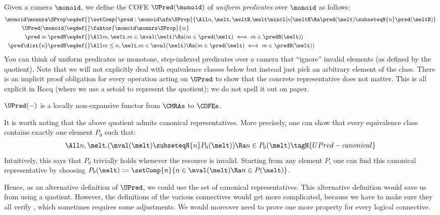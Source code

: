 Given a camera $\monoid$, we define the COFE $\UPred(\monoid)$ of \emph{uniform predicates} over $\monoid$ as follows:
\begin{align*}
\monoid \monnra \SProp \eqdef{}& \setComp{\pred: \monoid \nfn \SProp}
{\All n, \melt, \meltB. \melt \mincl[n] \meltB \Ra \pred(\melt) \subseteqN{n} \pred(\meltB)} \\
  \UPred(\monoid) \eqdef{}&  \faktor{\monoid \monnra \SProp}{\equiv} \\
  \pred \equiv \predB \eqdef{}& \All m, \melt. m \in \mval(\melt) \Ra (m \in \pred(\melt) \iff  m \in \predB(\melt)) \\
  \pred \dist{n} \predB \eqdef{}& \All m \le n, \melt. m \in \mval(\melt) \Ra (m \in \pred(\melt) \iff  m \in \predB(\melt))
\end{align*}
You can think of uniform predicates as monotone, step-indexed predicates over a camera that ``ignore'' invalid elements (as defined by the quotient).
Note that we will not explicitly deal with equivalence classes below but instead just pick an arbitrary element of the class.
There is an implicit proof obligation for every operation acting on $\UPred$ to show that the concrete representative does not matter.
This is all explicit in Rocq (where we use a setoid to represent the quotient); we do not spell it out on paper.

$\UPred(-)$ is a locally non-expansive functor from $\CMRAs$ to $\COFEs$.

It is worth noting that the above quotient admits canonical
representatives. More precisely, one can show that every
equivalence class contains exactly one element $P_0$ such that:
\begin{align*}
  \All n, \melt.  (\mval(\melt) \subseteqN{n} P_0(\melt)) \Ra n \in P_0(\melt)  \tagH{UPred-canonical}
\end{align*}
Intuitively, this says that $P_0$ trivially holds whenever the resource is invalid.
Starting from any element $P$, one can find this canonical
representative by choosing $P_0(\melt) := \setComp{n}{n \in \mval(\melt) \Ra n \in P(\melt)}$.

Hence, as an alternative definition of $\UPred$, we could use the set
of canonical representatives. This alternative definition would
save us from using a quotient. However, the definitions of the various
connectives would get more complicated, because we have to make sure
they all verify , which sometimes requires some adjustments. We
would moreover need to prove one more property for every logical
connective.


